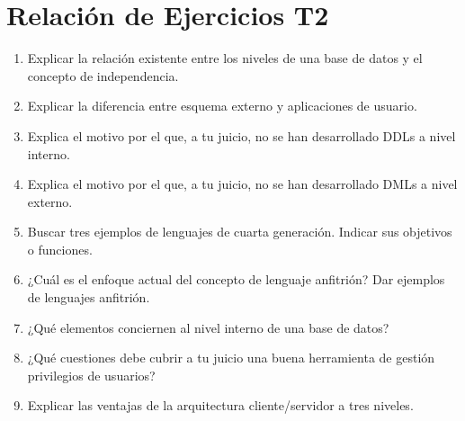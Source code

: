 





\section{Relación de Ejercicios T2}

\begin{enumerate}
    \item Explicar la relación existente entre los niveles de una base de datos y el concepto de independencia.
    \item Explicar la diferencia entre esquema externo y aplicaciones de usuario.
    \item Explica el motivo por el que, a tu juicio, no se han desarrollado DDLs a nivel interno.
    \item Explica el motivo por el que, a tu juicio, no se han desarrollado DMLs a nivel externo.
    \item Buscar tres ejemplos de lenguajes de cuarta generación. Indicar sus objetivos o funciones.
    \item ¿Cuál es el enfoque actual del concepto de lenguaje anfitrión? Dar ejemplos de lenguajes anfitrión.
    \item ¿Qué elementos conciernen al nivel interno de una base de datos?
    \item ¿Qué cuestiones debe cubrir a tu juicio una buena herramienta de gestión privilegios de usuarios?
    \item Explicar las ventajas de la arquitectura cliente/servidor a tres niveles.
\end{enumerate}